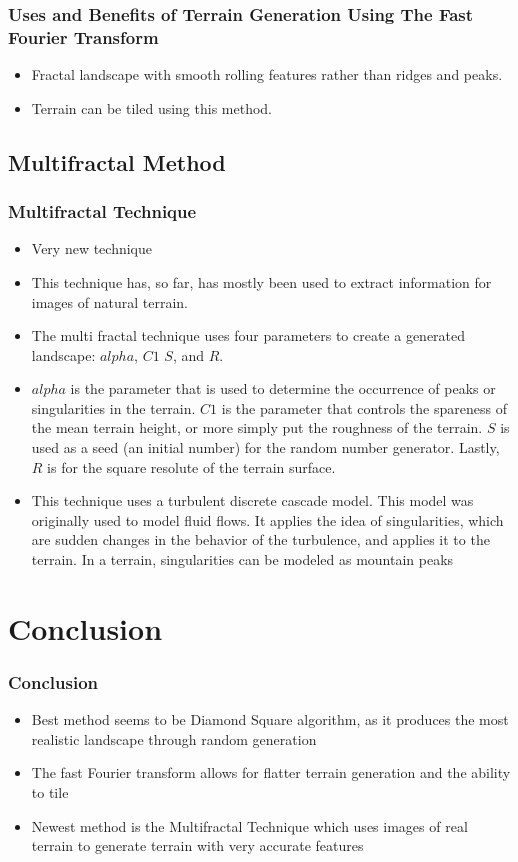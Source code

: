 \documentclass{beamer}
\begin{document}
\begin{frame}
\frametitle{Uses and Benefits of Terrain Generation Using The Fast Fourier Transform}
\begin{itemize}
\item Fractal landscape with smooth rolling features rather than ridges and peaks.
\item Terrain can be tiled using this method.
\end{itemize}
\end{frame}

\subsection{Multifractal Method}

\begin{frame}
 \frametitle{Multifractal Technique}
\begin{itemize}
\item Very new technique
\item This technique has, so far, has mostly been used to extract information for images of natural terrain. 
\item The multi fractal technique uses four parameters to create a generated landscape: $alpha$, $C1$ $S$, and $R$. 
\item $alpha$ is the parameter that is used to determine the occurrence of peaks or singularities in the terrain. $C1$ is the parameter that controls the spareness of the mean terrain height, or more simply put the roughness of the terrain. $S$ is used as a seed (an initial number) for the random number generator. Lastly, $R$ is for the square resolute of the terrain surface.
\item This technique uses a turbulent discrete cascade model. This model was originally used to model fluid flows. It applies the idea of singularities, which are sudden changes in the behavior of the turbulence, and applies it to the terrain. In a terrain, singularities can be modeled as mountain peaks
\end{itemize}
\end{frame}

\section{Conclusion}

\begin{frame}
 \frametitle{Conclusion}
\begin{itemize}
  \item Best method seems to be Diamond Square algorithm, as it produces the most realistic landscape through random generation
  \item The fast Fourier transform allows for flatter terrain generation and the ability to tile
 \item Newest method is the Multifractal Technique which uses images of real terrain to generate terrain with very accurate features
  \end{itemize}
  \end{frame}
  
\end{document}
